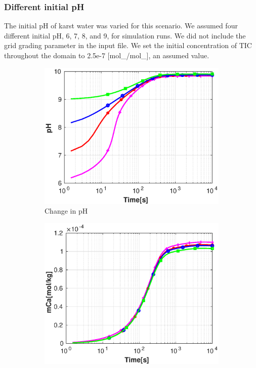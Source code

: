 \subsubsection*{Different initial pH} \label{ssec:diffinitialpHnoflow}
The initial pH of karst water was varied for this scenario. We assumed four different initial pH, 6, 7, 8, and 9, 
for simulation runs. We did not include the grid grading parameter in the input file. We set the initial concentration of TIC throughout the domain to 
2.5e-7 [mol\_/mol\_], an assumed value.\\

\begin{figure}[!h]
        \centering
    \begin{subfigure}{.5\linewidth}
            \centering
        \includegraphics[width=\textwidth]{PICTURES/without_pH_pH.eps}
        \caption{\small Change in pH}
        \label{fig:withoutpHpH}
    \end{subfigure}%
        \hfill
    \begin{subfigure}{.5\linewidth}
            \centering
        \includegraphics[width=\textwidth]{PICTURES/without_pH_mCa.eps}

\end{subfigure}
\end{figure}
